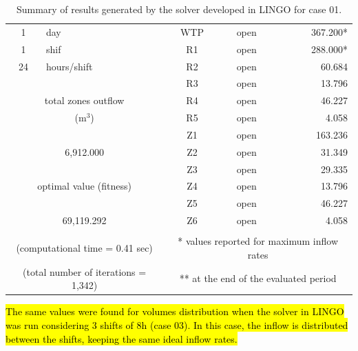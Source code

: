 \documentclass{singlecol}
\theoremstyle{TH}{
\newtheorem{lemma}{Lemma}
\newtheorem{theorem}[lemma]{Theorem}
\newtheorem{corrolary}[lemma]{Corrolary}
\newtheorem{conjecture}[lemma]{Conjecture}
\newtheorem{proposition}[lemma]{Proposition}
\newtheorem{claim}[lemma]{Claim}
\newtheorem{stheorem}[lemma]{Wrong Theorem}
\newtheorem{algorithm}{Algorithm}
}
\theoremstyle{THrm}{
\newtheorem{definition}{Definition}[section]
\newtheorem{question}{Question}[section]
\newtheorem{remark}{Remark}
\newtheorem{scheme}{Scheme}
}
\theoremstyle{THhit}{
\newtheorem{case}{Case}[section]
}
\begin{document}
\begin{table}[h!]
\begin{center}
\begin{small}
\begin{tabular}{ c r r r r r }
		   \\
1   &  \multicolumn{1}{l}{day} &  & \multicolumn{1}{c}{WTP} & \multicolumn{1}{c}{open} &  367.200* \\
1   &  \multicolumn{1}{l}{shif} & & \multicolumn{1}{c}{R1}  & \multicolumn{1}{c}{open} &  288.000* \\
24  &  \multicolumn{1}{l}{hours/shift} & & \multicolumn{1}{c}{R2} & \multicolumn{1}{c}{open} &   60.684\\
	&      &                  & \multicolumn{1}{c}{R3}     & \multicolumn{1}{c}{open} &    13.796 \\
\multicolumn{3}{c}{total zones outflow} & \multicolumn{1}{c}{R4} & \multicolumn{1}{c}{open}  &   46.227 \\
\multicolumn{3}{c}{($\mathrm{m^3}$)}& \multicolumn{1}{c}{R5}     & \multicolumn{1}{c}{open} &     4.058 \\
	   &      &              		& \multicolumn{1}{c}{Z1}     & \multicolumn{1}{c}{open} &   163.236 \\
\multicolumn{3}{c}{6,912.000}       & \multicolumn{1}{c}{Z2}     & \multicolumn{1}{c}{open} &    31.349 \\
	   &      &              		& \multicolumn{1}{c}{Z3}     & \multicolumn{1}{c}{open} &    29.335 \\\multicolumn{3}{c}{optimal value (fitness)} & \multicolumn{1}{c}{Z4} & \multicolumn{1}{c}{open} &13.796 \\
	   &      &             	    & \multicolumn{1}{c}{Z5}     & \multicolumn{1}{c}{open} &    46.227 \\
\multicolumn{3}{c}{69,119.292}       & \multicolumn{1}{c}{Z6}     & \multicolumn{1}{c}{open} &     4.058 \\\\
\multicolumn{3}{c}{(computational time  = 0.41 sec)}     & \multicolumn{3}{c}{* values reported for maximum inflow rates} \\
\multicolumn{3}{c}{(total number of iterations = 1,342)}   & \multicolumn{3}{c}{** at the end of the evaluated period} 
	\end{tabular}
\end{small}
\caption{Summary of results generated by the solver developed in LINGO for case 01.}
\label{tab:lingoEvalCase01}
\end{center}
\end{table}

\hl{The same values were found for volumes distribution when the solver in LINGO was run considering 3 shifts of 8h (case 03). In this case, the inflow is distributed between the shifts, keeping the same ideal inflow rates.}
\end{document}
